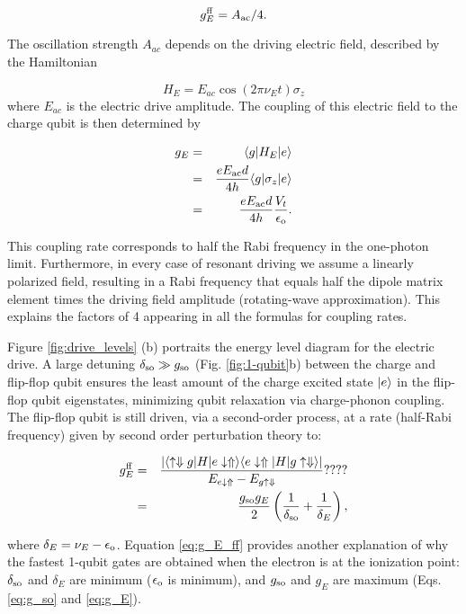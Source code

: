 \begin{equation}\label{eq:gE_Aac}
g_E^{\rm ff}=A_{\rm ac}/4.
\end{equation}

The oscillation strength $A_{ac}$ depends on the driving electric field, described by the Hamiltonian 

\begin{equation}
H_{E}=E_{ac}\cos(2\pi\nu_E t)\sigma_z
\end{equation}
where $E_{ac}$ is the electric drive amplitude.  The coupling of this electric field to the charge qubit is then determined by 

\begin{eqnarray} \label{eq:g_E}
g_{E}& =& \langle g|H_{E}|e\rangle\\
 &=& \frac{e E_{\rm ac} d}{4h}\langle g|\sigma_z|e\rangle\\
 & = &\frac{e E_{\rm ac} d}{4h}\frac{V_t}{\epsilon_{\rm o}}.
\end{eqnarray}

This coupling rate corresponds to half the Rabi frequency in the one-photon limit. Furthermore, in every case of resonant driving we assume a linearly polarized field, resulting in a Rabi frequency that equals half the dipole matrix element times the driving field amplitude (rotating-wave approximation). This explains the factors of 4 appearing in all the formulas for coupling rates.

Figure \ref{fig:drive_levels} (b) portraits the energy level diagram for the electric drive.  A large detuning $\delta_{\rm so}\gg g_{\rm so}$ (Fig. \ref{fig:1-qubit}b) between the charge and flip-flop qubit ensures the least amount of the charge excited state $|e\rangle$ in the flip-flop qubit eigenstates, minimizing qubit relaxation via charge-phonon coupling. The flip-flop qubit is still driven, via a second-order process, at a rate (half-Rabi frequency) given by second order perturbation theory to:
 
 \begin{eqnarray} \label{eq:g_E_ff}
g^{\rm ff}_{E}&=&\frac{\left| \langle \uparrow\Downarrow g|H|e\downarrow\Uparrow\rangle\langle e\downarrow\Uparrow|H|g\uparrow\Downarrow\rangle\right|}{E_{e\downarrow\Uparrow}-E_{g\uparrow\Downarrow}} ???? \\
&=&\frac{g_{\rm so}g_{E}}{2}\left(\frac{1}{\delta_{\rm so}}+\frac{1}{\delta_E}\right),
\end{eqnarray}


where $\delta_E=\nu_E-\epsilon_{\rm o}$.
Equation \ref{eq:g_E_ff} provides another explanation of why the fastest 1-qubit gates are obtained when the electron is at the ionization point: $\delta_{\rm so}$ and $\delta_E$ are minimum ($\epsilon_{\rm o}$ is minimum), and $g_{\rm so}$ and $g_E$ are maximum (Eqs. \ref{eq:g_so} and \ref{eq:g_E}).

